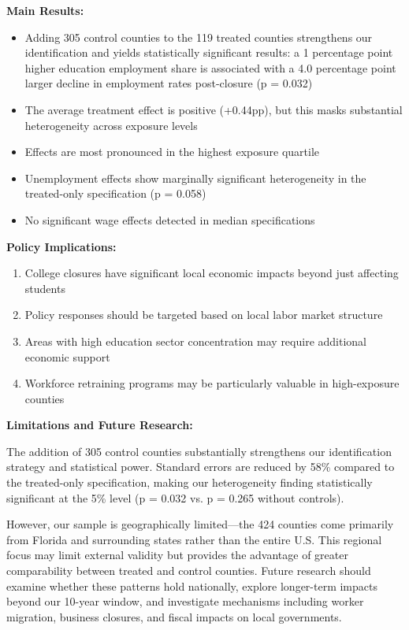 \documentclass[12pt]{article}
\begin{document}
\textbf{Main Results:}

\begin{itemize}
\item Adding 305 control counties to the 119 treated counties strengthens our identification and yields statistically significant results: a 1 percentage point higher education employment share is associated with a 4.0 percentage point larger decline in employment rates post-closure (p = 0.032)

\item The average treatment effect is positive (+0.44pp), but this masks substantial heterogeneity across exposure levels

\item Effects are most pronounced in the highest exposure quartile

\item Unemployment effects show marginally significant heterogeneity in the treated-only specification (p = 0.058)

\item No significant wage effects detected in median specifications
\end{itemize}

\textbf{Policy Implications:}

\begin{enumerate}
\item College closures have significant local economic impacts beyond just affecting students

\item Policy responses should be targeted based on local labor market structure

\item Areas with high education sector concentration may require additional economic support

\item Workforce retraining programs may be particularly valuable in high-exposure counties
\end{enumerate}

\textbf{Limitations and Future Research:}

The addition of 305 control counties substantially strengthens our identification strategy and statistical power. Standard errors are reduced by 58\% compared to the treated-only specification, making our heterogeneity finding statistically significant at the 5\% level (p = 0.032 vs. p = 0.265 without controls). 

However, our sample is geographically limited—the 424 counties come primarily from Florida and surrounding states rather than the entire U.S. This regional focus may limit external validity but provides the advantage of greater comparability between treated and control counties. Future research should examine whether these patterns hold nationally, explore longer-term impacts beyond our 10-year window, and investigate mechanisms including worker migration, business closures, and fiscal impacts on local governments.
\end{document}
